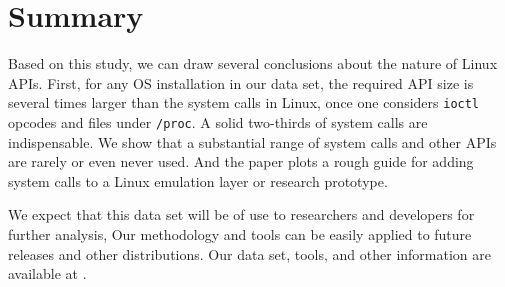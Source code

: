 \section{Summary}
\label{sec:syspop:summary}

Based on this study, we can draw several conclusions about the nature of Linux APIs.
First, for any OS installation in our data set, the required API size
is several times larger than the \syscallnum{} system calls in Linux, once one considers
{\tt ioctl} opcodes and files under {\tt /proc}.  A solid two-thirds of system calls are indispensable.
We show that a substantial range of system calls and other APIs are rarely or even never used.
And the paper plots a rough guide for adding system calls to a Linux emulation layer or research prototype.

We expect that this data set will be of use to researchers and developers for further analysis,
Our methodology and tools can be easily applied to future releases and other distributions.
Our data set, tools, and other information are available at \projecturl{}.
